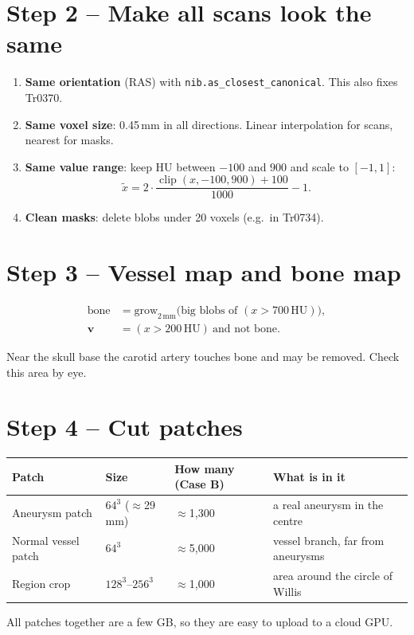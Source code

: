 \documentclass[11pt,a4paper,oneside]{report}
\begin{document}
\section*{Step 2 -- Make all scans look the same}
\begin{enumerate}
  \item \textbf{Same orientation} (RAS) with \texttt{nib.as\_closest\_canonical}. This also fixes Tr0370.
  \item \textbf{Same voxel size}: 0.45\,mm in all directions. Linear interpolation for scans, nearest for masks.
  \item \textbf{Same value range}: keep HU between $-100$ and $900$ and scale to $[-1,1]$:
  \begin{equation}
  \tilde x = 2\cdot\frac{\operatorname{clip}(x,-100,900)+100}{1000} - 1 .
  \end{equation}
  \item \textbf{Clean masks}: delete blobs under 20 voxels (e.g.\ in Tr0734).
\end{enumerate}

\section*{Step 3 -- Vessel map and bone map}
\begin{align}
\text{bone} &= \text{grow}_{2\,\text{mm}}\Big(\text{big blobs of }(x>700\,\text{HU})\Big),\\
\bm v &= (x > 200\,\text{HU})\ \text{and not bone}.
\end{align}
\begin{note}
Near the skull base the carotid artery touches bone and may be removed. Check this area by eye.
\end{note}

\section*{Step 4 -- Cut patches}
\begin{center}
\small
\begin{tabular}{llll}
\toprule
\textbf{Patch} & \textbf{Size} & \textbf{How many (Case B)} & \textbf{What is in it} \\
\midrule
Aneurysm patch & $64^3$ ($\approx$29\,mm) & $\approx$1{,}300 & a real aneurysm in the centre \\
Normal vessel patch & $64^3$ & $\approx$5{,}000 & vessel branch, far from aneurysms \\
Region crop & $128^3$--$256^3$ & $\approx$1{,}000 & area around the circle of Willis \\
\bottomrule
\end{tabular}
\end{center}
All patches together are a few GB, so they are easy to upload to a cloud GPU.
\end{document}
